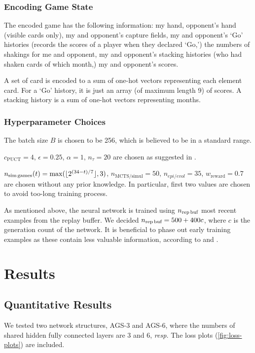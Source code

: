 \documentclass[10pt,twocolumn,letterpaper]{article}
\begin{document}
\subsubsection{Encoding Game State}
The encoded game has the following information: my hand, opponent's hand (visible cards only), my and opponent's capture fields, my and opponent's `Go' histories (records the scores of a player when they declared `Go,') the numbers of shakings for me and opponent, my and opponent's stacking histories (who had shaken cards of which month,) my and opponent's scores.

A set of card is encoded to a sum of one-hot vectors representing each element card. For a `Go' history, it is just an array (of maximum length 9) of scores. A stacking history is a sum of one-hot vectors representing months.

\subsubsection{Hyperparameter Choices}
The batch size $B$ is chosen to be 256, which is believed to be in a standard range.

$c_\text{PUCT}=4$, $\epsilon=0.25$, $\alpha=1$, $n_\tau=20$ are chosen as suggested in \cite{Ora2018}.

$n_\text{sim\,games}(t) = \max( \lfloor 2^{(34 - t) / 7}\rfloor, 3)$, $n_\text{MCTS/simul}=50$, $n_{epi/evol} = 35$, $w_\text{reward} = 0.7$ are chosen without any prior knowledge. In particular, first two values are chosen to avoid too-long training process.

As mentioned above, the neural network is trained using $n_\text{rep\,buf}$ most recent examples from the replay buffer. We decided $n_\text{rep\,buf} = 500 + 400c$, where $c$ is the generation count of the network. It is beneficial to phase out early training examples as these contain less valuable information, according to \cite{Ora2018} and \cite{CarOhm2019}.


\section{Results}
\label{sec:results}

\subsection{Quantitative Results}

We tested two network structures, AGS-3 and AGS-6, where the numbers of shared hidden fully connected layers are 3 and 6, \textit{resp.} The loss plots (\cref{fig:loss-plots}) are included.
\end{document}
